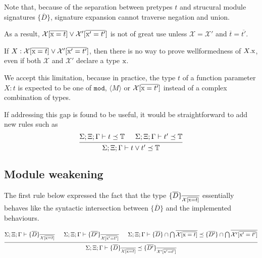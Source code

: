 \documentclass[12pt]{article}
\newcommand{\tx}{\text{\rm x}}
\newcommand{\BX}{\ensuremath{\mathcal{X}}}
\newcommand{\Gammatop}{\ensuremath{\Xi}}
\newcommand{\Gammabot}{\ensuremath{\Gamma}}
\renewcommand{\mod}{\texttt{mod}}
\begin{document}
Note that, because of the separation between pretypes $t$ and strucural module signatures $\{ \overline{D} \}$,
signature expansion cannot traverse negation and union.

As a result, $\BX[\overline{\tx = t}] \vee \BX'[\overline{\tx' = t'}]$ is not of great use unless
$\BX = \BX'$ and $\overline{t} = \overline{t'}$.

If $X : \BX[\overline{\tx = t}] \vee \BX'[\overline{\tx' = t'}]$, then
there is no way to prove wellformedness of $X.\tx$, even if both $\BX$ and $\BX'$ declare a type $\tx$.

We accept this limitation, because in practice, the type $t$ of a function parameter $X : t$ is expected to be one of $\mod$, $\langle M \rangle$
or $\BX[\overline{\tx = t'}]$ instead of a complex combination of types.

If addressing this gap is found to be useful, it would be straightforward to add new rules such as
\[
    \begin{prooftree}
        \hypo { \Sigma; \Gammatop; \Gammabot \vdash t \preceq \mathbb{T} }
        \hypo { \Sigma; \Gammatop; \Gammabot  \vdash t' \preceq \mathbb{T} }
        \infer2{ \Sigma; \Gammatop; \Gammabot \vdash t \vee t' \preceq \mathbb{T} }
    \end{prooftree}
\]

\subsection{Module weakening}

The first rule below expressed the fact that the type $\{ \overline{D} \}_{\overline{\BX[\overline{\tx = t}]}}$
essentially behaves like the syntactic intersection between
$\{ \overline{D} \}$ and the implemented behaviours.

\[
    \begin{prooftree}
        \hypo{ \Sigma; \Gammatop; \Gammabot \vdash \{ \overline{D} \}_{\overline{\BX[\overline{\tx = t}]} } }
        \hypo{ \Sigma; \Gammatop; \Gammabot \vdash \{ \overline{D'} \}_{\overline{\BX[\overline{\tx' = t'}]} } }
        \hypo{ \Sigma; \Gammatop; \Gammabot \vdash \{ \overline{D} \} \cap \bigcap \overline{\BX[\overline{\tx = t}]} \preceq \{ \overline{D'} \} \cap \bigcap \overline{\BX'[\overline{\tx' = t'}]}}
        \infer3{ \Sigma; \Gammatop; \Gammabot \vdash \{ \overline{D} \}_{\overline{\BX[\overline{\tx = t}]} } \preceq \{ \overline{D'} \}_{\overline{\BX'[\overline{\tx' = t'}]} } }
    \end{prooftree}
\] \\
\end{document}
